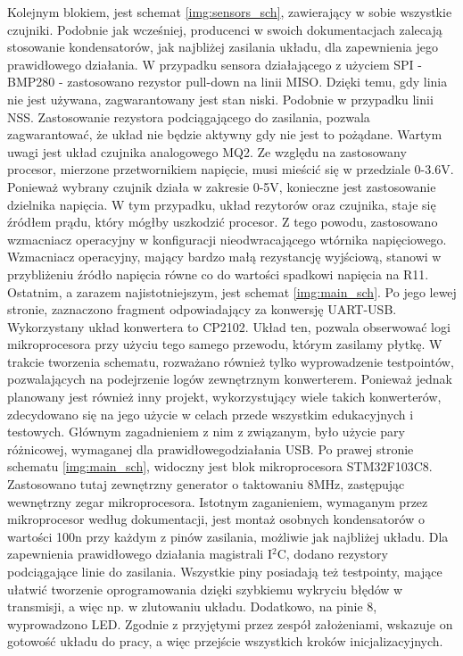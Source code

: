 Kolejnym blokiem, jest schemat \ref{img:sensors_sch}, zawierający w sobie wszystkie czujniki. Podobnie jak wcześniej, producenci w swoich dokumentacjach zalecają stosowanie kondensatorów, jak najbliżej zasilania układu, dla zapewnienia jego prawidłowego działania. W przypadku sensora działającego z użyciem SPI - BMP280 - zastosowano rezystor pull-down na linii MISO\cite{bmp_datasheet}. Dzięki temu, gdy linia nie jest używana, zagwarantowany jest stan niski. Podobnie w przypadku linii NSS. Zastosowanie rezystora podciągającego do zasilania, pozwala zagwarantować, że układ nie będzie aktywny gdy nie jest to pożądane.\newline
Wartym uwagi jest układ czujnika analogowego MQ2. Ze względu na zastosowany procesor, mierzone przetwornikiem napięcie, musi mieścić się w przedziale 0-3.6V. Ponieważ wybrany czujnik działa w zakresie 0-5V, konieczne jest zastosowanie dzielnika napięcia. W tym przypadku, układ rezytorów oraz czujnika, staje się źródłem prądu, który mógłby uszkodzić procesor. Z tego powodu, zastosowano wzmacniacz operacyjny w konfiguracji nieodwracającego wtórnika napięciowego. Wzmacniacz operacyjny, mający bardzo małą rezystancję wyjściową, stanowi w przybliżeniu źródło napięcia równe co do wartości spadkowi napięcia na R11.
\newline
\newline
Ostatnim, a zarazem najistotniejszym, jest schemat \ref{img:main_sch}. Po jego lewej stronie, zaznaczono fragment odpowiadający za konwersję UART-USB. Wykorzystany układ konwertera to CP2102\cite{cp2102_datasheet}. Układ ten, pozwala obserwować logi mikroprocesora przy użyciu tego samego przewodu, którym zasilamy płytkę. W trakcie tworzenia schematu, rozważano również tylko wyprowadzenie testpointów, pozwalających na podejrzenie logów zewnętrznym konwerterem. Ponieważ jednak planowany jest również inny projekt, wykorzystujący wiele takich konwerterów, zdecydowano się na jego użycie w celach przede wszystkim edukacyjnych i testowych. Głównym zagadnieniem z nim z związanym, było użycie pary różnicowej, wymaganej dla prawidłowegodziałania USB.
\newline
Po prawej stronie schematu \ref{img:main_sch}, widoczny jest blok mikroprocesora STM32F103C8. Zastosowano tutaj zewnętrzny generator o taktowaniu 8MHz, zastępując wewnętrzny zegar mikroprocesora. Istotnym zaganieniem, wymaganym przez mikroprocesor według dokumentacji, jest montaż osobnych kondensatorów o wartości 100n przy każdym z pinów zasilania, możliwie jak najbliżej układu. Dla zapewnienia prawidłowego działania magistrali I$^2$C, dodano rezystory podciągające linie do zasilania. Wszystkie piny posiadają też testpointy, mające ułatwić tworzenie oprogramowania dzięki szybkiemu wykryciu błędów w transmisji, a więc np. w zlutowaniu układu. Dodatkowo, na pinie 8, wyprowadzono LED. Zgodnie z przyjętymi przez zespół założeniami, wskazuje on gotowość układu do pracy, a więc przejście wszystkich kroków inicjalizacyjnych.
